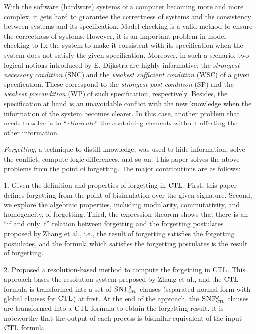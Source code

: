 \begin{englishabstract}
 With the software (hardware) systems of a computer becoming more and more complex, it gets hard to guarantee the correctness of systems and the consistency between systems and its specification.
Model checking is a valid method to ensure the correctness of systems. However, it is an important problem in model checking to fix the system to make it consistent with its specification when the system does not satisfy the given specification.
Moreover, in such a scenario, two logical notions introduced by E. Dijkstra are highly informative: the \emph{strongest necessary condition} (SNC) and the \emph{weakest sufficient condition}  (WSC)  of a given specification. These correspond to the \emph{strongest post-condition} (SP) and the \emph{weakest precondition} (WP) of such specification, respectively.
Besides, the specification at hand is an unavoidable conflict with the new knowledge when the information of the system becomes clearer. In this case, another problem that needs to solve is to ``\emph{eliminate}” the containing elements without affecting the other information.

\emph{Forgetting}, a technique to distill knowledge, was used to hide information, solve the conflict, compute logic differences, and so on. This paper solves the above problems from the point of forgetting. The major contributions are as follows:

1. Given the definition and properties of forgetting in $\textrm{CTL}$. First, this paper defines forgetting from the point of bisimulation over the given signature. Second, we explore the algebraic properties, including modularity, commutativity, and homogeneity, of forgetting. Third, the expression theorem shows that there is an ``if and only if” relation between forgetting and the forgetting postulates proposed by Zhang et al., i.e., the result of forgetting satisfies the forgetting postulates, and the formula which satisfies the forgetting postulates is the result of forgetting.

2. Proposed a resolution-based method to compute the forgetting in $\textrm{CTL}$. This approach bases the resolution system proposed by Zhang et al., and the $\textrm{CTL}$ formula is transformed into a set of ${\textsc{SNF}_{\textsc{ctl}}^g}$ clauses (separated normal form with global clauses for $\textrm{CTL}$) at first. At the end of the approach, the ${\textsc{SNF}_{\textsc{ctl}}^g}$ clauses are transformed into a $\textrm{CTL}$ formula to obtain the forgetting result. It is noteworthy that the output of each process is bisimilar equivalent of the input $\textrm{CTL}$ formula.


\end{englishabstract}
